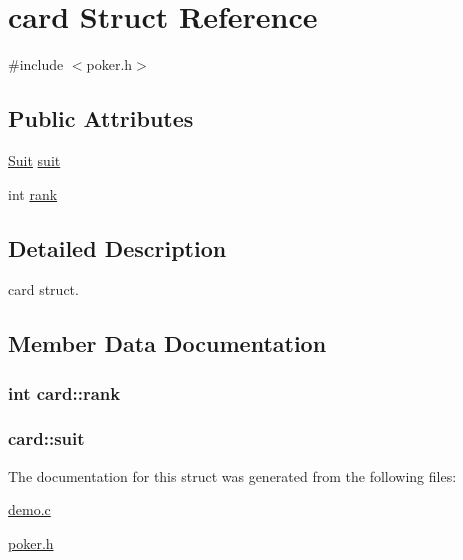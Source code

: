 \hypertarget{structcard}{\section{card Struct Reference}
\label{structcard}
}


{\ttfamily \#include $<$poker.\+h$>$}

\subsection*{Public Attributes}
\begin{DoxyCompactItemize}
\item 
\hyperlink{demo_8c_a2b1ea04090b8ece69f59a1f89b5ef903}{Suit} \hyperlink{structcard_a3f809473f93b4046f53540be5938d593}{suit}
\item 
int \hyperlink{structcard_ae355921876ab9466544d9971bbc6821b}{rank}
\end{DoxyCompactItemize}


\subsection{Detailed Description}
card struct. 

\subsection{Member Data Documentation}
\hypertarget{structcard_ae355921876ab9466544d9971bbc6821b}{
\subsubsection[{rank}]{\setlength{\rightskip}{0pt plus 5cm}int card\+::rank}}\label{structcard_ae355921876ab9466544d9971bbc6821b}
\hypertarget{structcard_a3f809473f93b4046f53540be5938d593}{
\subsubsection[{suit}]{ card\+::suit}}\label{structcard_a3f809473f93b4046f53540be5938d593}


The documentation for this struct was generated from the following files\+:\begin{DoxyCompactItemize}
\item 
\hyperlink{demo_8c}{demo.\+c}\item 
\hyperlink{poker_8h}{poker.\+h}\end{DoxyCompactItemize}
